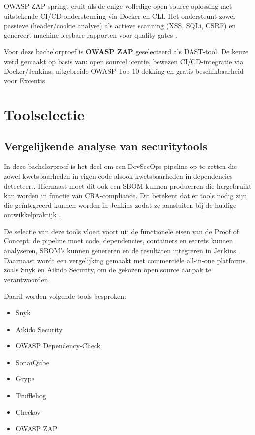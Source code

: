 OWASP ZAP springt eruit als de enige volledige open source oplossing met uitstekende CI/CD-ondersteuning via Docker en CLI. Het ondersteunt zowel passieve (header/cookie analyse) als actieve scanning (XSS, SQLi, CSRF) en genereert machine-leesbare rapporten voor quality gates \autocite{OWASPZAPDocs}.

Voor deze bachelorproef is \textbf{OWASP ZAP} geselecteerd als DAST-tool. De keuze werd gemaakt op basis van: open sourcel icentie, bewezen CI/CD-integratie via Docker/Jenkins, uitgebreide OWASP Top 10 dekking en gratis beschikbaarheid voor Excentis \autocite{OWASPZAPGithub}

\section{Toolselectie}

\subsection{Vergelijkende analyse van securitytools}

In deze bachelorproef is het doel om een DevSecOps-pipeline op te zetten die zowel kwetsbaarheden in eigen code alsook kwetsbaarheden in dependencies detecteert. Hiernaast moet dit ook een SBOM kunnen produceren die hergebruikt kan worden in functie van CRA-compliance. Dit betekent dat er tools nodig zijn die geïntegreerd kunnen worden in Jenkins zodat ze aansluiten bij de huidige ontwikkelpraktijk .

De selectie van deze tools vloeit voort uit de functionele eisen van de Proof of Concept: de pipeline moet code, dependencies, containers en secrets kunnen analyseren, SBOM's kunnen genereren en de resultaten integreren in Jenkins. Daarnaast wordt een vergelijking gemaakt met commerciële all-in-one platforms zoals Snyk en Aikido Security, om de gekozen open source aanpak te verantwoorden.

Daaril worden volgende tools besproken:
\begin{itemize}
  \item Snyk
  \item Aikido Security
  \item OWASP Dependency-Check
  \item SonarQube
  \item Grype
  \item Trufflehog
  \item Checkov
  \item OWASP ZAP
\end{itemize}

